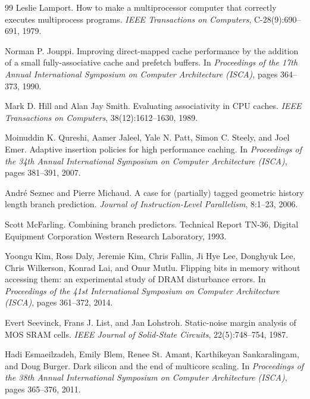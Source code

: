 \documentclass[12pt,a4paper]{report}
\begin{document}
\begin{thebibliography}{99}
Leslie Lamport.
How to make a multiprocessor computer that correctly executes
multiprocess programs.
\emph{IEEE Transactions on Computers}, C-28(9):690--691, 1979.

Norman P. Jouppi.
Improving direct-mapped cache performance by the addition of a small
fully-associative cache and prefetch buffers.
In \emph{Proceedings of the 17th Annual International Symposium on
Computer Architecture (ISCA)}, pages 364--373, 1990.

Mark D. Hill and Alan Jay Smith.
Evaluating associativity in CPU caches.
\emph{IEEE Transactions on Computers}, 38(12):1612--1630, 1989.

Moinuddin K. Qureshi, Aamer Jaleel, Yale N. Patt, Simon C. Steely,
and Joel Emer.
Adaptive insertion policies for high performance caching.
In \emph{Proceedings of the 34th Annual International Symposium on
Computer Architecture (ISCA)}, pages 381--391, 2007.

Andr\'e Seznec and Pierre Michaud.
A case for (partially) tagged geometric history length branch prediction.
\emph{Journal of Instruction-Level Parallelism}, 8:1--23, 2006.

Scott McFarling.
Combining branch predictors.
Technical Report TN-36, Digital Equipment Corporation Western Research
Laboratory, 1993.

Yoongu Kim, Ross Daly, Jeremie Kim, Chris Fallin, Ji Hye Lee,
Donghyuk Lee, Chris Wilkerson, Konrad Lai, and Onur Mutlu.
Flipping bits in memory without accessing them: an experimental study
of DRAM disturbance errors.
In \emph{Proceedings of the 41st International Symposium on Computer
Architecture (ISCA)}, pages 361--372, 2014.

Evert Seevinck, Frans J. List, and Jan Lohstroh.
Static-noise margin analysis of MOS SRAM cells.
\emph{IEEE Journal of Solid-State Circuits}, 22(5):748--754, 1987.

Hadi Esmaeilzadeh, Emily Blem, Renee St. Amant,
Karthikeyan Sankaralingam, and Doug Burger.
Dark silicon and the end of multicore scaling.
In \emph{Proceedings of the 38th Annual International Symposium on
Computer Architecture (ISCA)}, pages 365--376, 2011.


\end{thebibliography}
\end{document}
